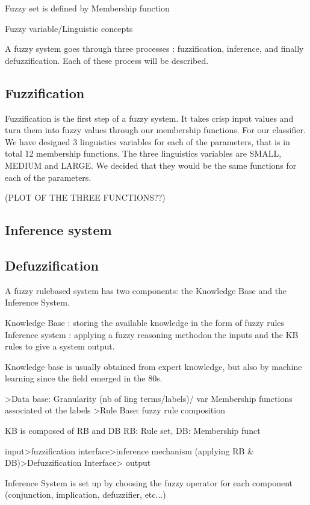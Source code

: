 \documentclass[a4paper,12pt]{article}
\begin{document}
Fuzzy set is defined by Membership function

Fuzzy variable/Linguistic concepts

A fuzzy system goes through three processes : fuzzification, inference, and finally defuzzification. Each of these process will be described.


\subsection{Fuzzification}

Fuzzification is the first step of a fuzzy system. It takes crisp input values and turn them into fuzzy values through our membership functions.
For our classifier. We have designed 3 linguistics variables for each of the parameters, that is in total 12 membership functions.
The three linguistics variables are SMALL, MEDIUM and LARGE. We decided that they would be the same functions for each of the parameters.

(PLOT OF THE THREE FUNCTIONS??)

\subsection{Inference system}

\subsection{Defuzzification}


A fuzzy rulebased system has two components: the Knowledge Base and the Inference System.

Knowledge Base : storing the available knowledge in the form of fuzzy rules
Inference system : applying a fuzzy reasoning methodon the inputs and the KB rules to give a system output.


Knowledge base is usually obtained from expert knowledge, but also by machine learning since the field emerged in the 80s.

>Data base:
Granularity (nb of ling terms/labels)/ var
Membership functions associated ot the labels
>Rule Base: fuzzy rule composition

KB is composed of RB and DB
RB: Rule set, DB: Membership funct

input>fuzzification interface>inference mechanism (applying RB \& DB)>Defuzzification Interface> output






Inference System is set up by choosing the fuzzy operator for each component (conjunction, implication, defuzzifier, etc...)
\end{document}
